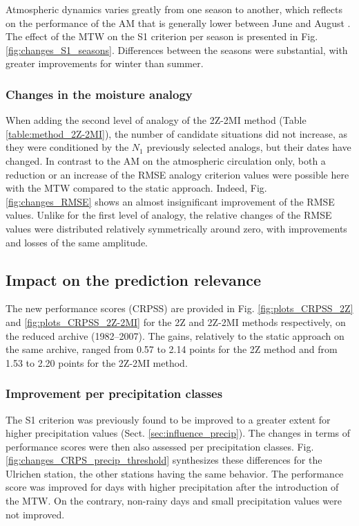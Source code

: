 \documentclass[hess, manuscript]{copernicus}
\begin{document}
Atmospheric dynamics varies greatly from one season to another, which reflects on the performance of the AM that is generally lower between June and August \citep{Bliefernicht2010}. The effect of the MTW on the S1 criterion per season is presented in Fig. \ref{fig:changes_S1_seasons}. Differences between the seasons were substantial, with greater improvements for winter than summer. 


\subsubsection{Changes in the moisture analogy}
\label{sec:perf_2Z-2MI}

When adding the second level of analogy of the 2Z-2MI method (Table \ref{table:method_2Z-2MI}), the number of candidate situations did not increase, as they were conditioned by the $N_{1}$ previously selected analogs, but their dates have changed. In contrast to the AM on the atmospheric circulation only, both a reduction or an increase of the RMSE analogy criterion values were possible here with the MTW compared to the static approach. Indeed, Fig. \ref{fig:changes_RMSE} shows an almost insignificant improvement of the RMSE values. Unlike for the first level of analogy, the relative changes of the RMSE values were distributed relatively symmetrically around zero, with improvements and losses of the same amplitude.


\subsection{Impact on the prediction relevance}
\label{sec:influence_scores}

The new performance scores (CRPSS) are provided in Fig. \ref{fig:plots_CRPSS_2Z} and \ref{fig:plots_CRPSS_2Z-2MI} for the 2Z and 2Z-2MI methods respectively, on the reduced archive (1982--2007). The gains, relatively to the static approach on the same archive, ranged from 0.57 to 2.14 points for the 2Z method and from 1.53 to 2.20 points for the 2Z-2MI method. 


\subsubsection{Improvement per precipitation classes}
\label{sec:improvement_CRPSS_precip_threshold}

The S1 criterion was previously found to be improved to a greater extent for higher precipitation values (Sect. \ref{sec:influence_precip}). The changes in terms of performance scores were then also assessed per precipitation classes. Fig. \ref{fig:changes_CRPS_precip_threshold} synthesizes these differences for the Ulrichen station, the other stations having the same behavior. The performance score was improved for days with higher precipitation after the introduction of the MTW. On the contrary, non-rainy days and small precipitation values were not improved.
\end{document}
